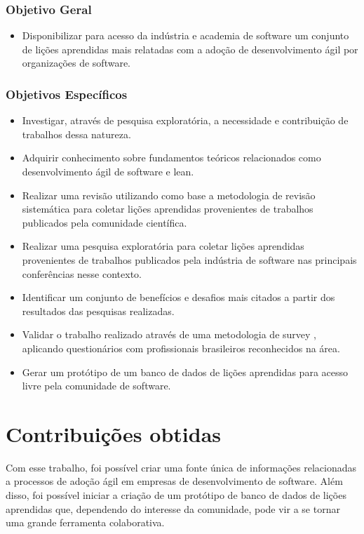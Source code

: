 \subsubsection{Objetivo Geral}

\begin{itemize}
	\item Disponibilizar para acesso da indústria e academia de software um conjunto de lições aprendidas mais relatadas com a adoção de desenvolvimento ágil por organizações de software.
\end{itemize}

\subsubsection{Objetivos Específicos}

\begin{itemize}
	\item Investigar, através de pesquisa exploratória, a necessidade e contribuição de trabalhos dessa natureza.
	\item Adquirir conhecimento sobre fundamentos teóricos relacionados como desenvolvimento ágil de software e lean.
	\item Realizar uma revisão utilizando como base a metodologia de revisão sistemática \cite{Barbara04} para coletar lições aprendidas provenientes de trabalhos publicados pela comunidade científica.
	\item Realizar uma pesquisa exploratória para coletar lições aprendidas provenientes de trabalhos publicados pela indústria de software nas principais conferências nesse contexto.
	\item Identificar um conjunto de benefícios e desafios mais citados a partir dos resultados das pesquisas realizadas.
	\item Validar o trabalho realizado através de uma metodologia de survey \cite{Babbie1990}, aplicando questionários com profissionais brasileiros reconhecidos na área.
	\item Gerar um protótipo de um banco de dados de lições aprendidas para acesso livre pela comunidade de software.
\end{itemize}

\section{Contribuições obtidas}

Com esse trabalho, foi possível criar uma fonte única de informações relacionadas a processos de adoção ágil em empresas de desenvolvimento de software. Além disso, foi possível iniciar a criação de um protótipo de banco de dados de lições aprendidas que, dependendo do interesse da comunidade, pode vir a se tornar uma grande ferramenta colaborativa.

